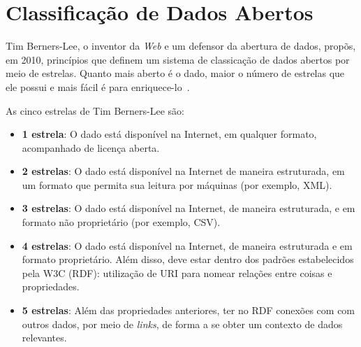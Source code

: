\section{Classificação de Dados Abertos}
Tim Berners-Lee, o inventor da \emph{Web} e um defensor da abertura de dados, propõs, em 2010, princípios que definem um sistema de classicação de dados abertos por meio de estrelas. Quanto mais aberto é o dado, maior o número de estrelas que ele possui e mais fácil é para enriquece-lo~\cite{seijiconectados}.

As cinco estrelas de Tim Berners-Lee são:
\begin{itemize}
\item \textbf{1 estrela}: O dado está disponível na Internet, em qualquer formato, acompanhado de licença aberta.
\item \textbf{2 estrelas}: O dado está disponível na Internet de maneira estruturada, em um formato que permita sua leitura por máquinas (por exemplo, XML).
\item \textbf{3 estrelas}: O dado está disponível na Internet, de maneira estruturada, e em formato não proprietário (por exemplo, CSV).
\item \textbf{4 estrelas}: O dado está disponível na Internet, de maneira estruturada e em formato proprietário. Além disso, deve estar dentro dos padrões estabelecidos pela W3C (RDF): utilização de URI para nomear relações entre coisas e propriedades.
\item \textbf{5 estrelas}: Além das propriedades anteriores, ter no RDF conexões com com outros dados, por meio de \emph{links}, de forma a se obter um contexto de dados relevantes.
\end{itemize}

